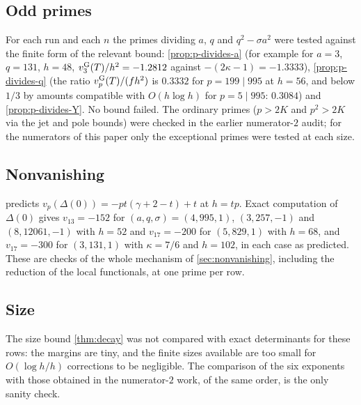 \subsection{Odd primes}
For each run and each $n$ the primes dividing $a$, $q$ and $q^2-\sigma a^2$ were tested against the
finite form of the relevant bound: \cref{prop:p-divides-a} (for example for $a=3$, $q=131$, $h=48$,
$v_{3}^{\mathrm{G}}(T)/h^2=-1.2812$ against $-(2\kappa-1)=-1.3333$), \cref{prop:p-divides-q} (the ratio
$v_{p}^{\mathrm{G}}(T)/(fh^2)$ is $0.3332$ for $p=199\mid995$ at $h=56$, and below $1/3$ by amounts
compatible with $O(h\log h)$ for $p=5\mid995$: $0.3084$) and \cref{prop:p-divides-Y}. No bound
failed. The ordinary primes ($p>2K$ and $p^2>2K$ via the jet and pole bounds) were checked
in the earlier numerator-$2$ audit; for the numerators of this paper only the exceptional primes
were tested at each size.

\subsection{Nonvanishing}
 predicts $v_p(\Delta(0))=-pt(\gamma+2-t)+t$ at $h=tp$. Exact computation of
$\Delta(0)$ gives $v_{13}=-152$ for $(a,q,\sigma)=(4,995,1)$, $(3,257,-1)$ and $(8,12061,-1)$ with
$h=52$ and $v_{17}=-200$ for $(5,829,1)$ with $h=68$, and $v_{17}=-300$ for $(3,131,1)$ with
$\kappa=7/6$ and $h=102$, in each case as predicted. These are checks of the whole mechanism of
\cref{sec:nonvanishing}, including the reduction of the local functionals, at one prime per row.

\subsection{Size}
The size bound \cref{thm:decay} was not compared with exact determinants for these rows: the
margins are tiny, and the finite sizes available are too small for $O(\log h/h)$ corrections to be
negligible. The comparison of the six exponents with those obtained in the numerator-$2$ work, of
the same order, is the only sanity check.
